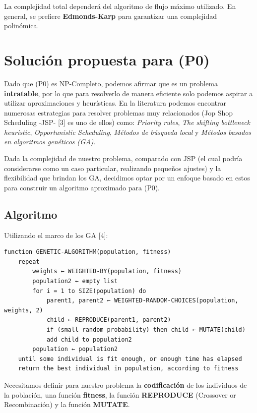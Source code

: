 \documentclass[14pt]{extarticle}
\begin{document}
La complejidad total dependerá del algoritmo de flujo máximo utilizado. En general, se prefiere \textbf{Edmonds-Karp} para garantizar una complejidad polinómica.

\section*{Solución propuesta para (P0)}

Dado que (P0) es NP-Completo, podemos afirmar que es un problema \textbf{intratable}, por lo que para resolverlo de manera eficiente solo podemos aspirar a utilizar aproximaciones y heurísticas. En la literatura podemos encontrar numerosas estrategias para resolver problemas muy relacionados (Jop Shop Scheduling -JSP- [3] es uno de ellos) como: \textit{Priority rules}, \textit{The shifting bottleneck heuristic}, \textit{Opportunistic Scheduling}, \textit{Métodos de búsqueda local} y \textit{Métodos basados en algoritmos genéticos (GA)}.

Dada la complejidad de nuestro problema, comparado con JSP (el cual podría considerarse como un caso particular, realizando pequeños ajustes) y la flexibilidad que brindan los GA, decidimos optar por un enfoque basado en estos para construir un algoritmo aproximado para (P0).

\subsection*{Algoritmo}

Utilizando el marco de los GA [4]:

\begin{verbatim}
function GENETIC-ALGORITHM(population, fitness)
    repeat
        weights ← WEIGHTED-BY(population, fitness)
        population2 ← empty list
        for i = 1 to SIZE(population) do
            parent1, parent2 ← WEIGHTED-RANDOM-CHOICES(population, weights, 2)
            child ← REPRODUCE(parent1, parent2)
            if (small random probability) then child ← MUTATE(child)
            add child to population2
        population ← population2
    until some individual is fit enough, or enough time has elapsed
    return the best individual in population, according to fitness
\end{verbatim}

Necesitamos definir para nuestro problema la \textbf{codificación} de los individuos de la población, una función \textbf{fitness}, la función \textbf{REPRODUCE} (Crossover or Recombinación) y la función \textbf{MUTATE}.
\end{document}
